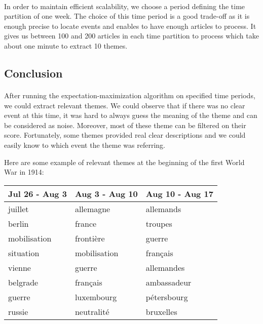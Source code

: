 \paragraph{}
In order to maintain efficient scalability, we choose a period defining the time partition of one week. The choice of this time period is a good trade-off as it is enough precise to locate events and enables to have enough articles to process. It gives us between 100 and 200 articles in each time partition to process which take about one minute to extract 10 themes.

\subsection{Conclusion}

\paragraph{}
After running the expectation-maximization algorithm on specified time periods, we could extract relevant themes. We could observe that if there was no clear event at this time, it was hard to always guess the meaning of the theme and can be considered as noise. Moreover, most of these theme can be filtered on their score. Fortunately, some themes provided real clear descriptions and we could easily know to which event the theme was referring.

Here are some example of relevant themes at the beginning of the first World War in 1914:

\begin{center}
\begin{tabular}{|l|l|l|}
  \hline
  Jul 26 - Aug 3 & Aug 3 - Aug 10 & Aug 10 - Aug 17 \\
  \hline
  juillet & allemagne & allemands \\
  berlin & france & troupes \\
  mobilisation & frontière & guerre \\
  situation & mobilisation & français \\
  vienne & guerre & allemandes \\
  belgrade & français & ambassadeur \\
  guerre & luxembourg & pétersbourg \\
  russie & neutralité & bruxelles \\
  \hline
\end{tabular}
\end{center}

